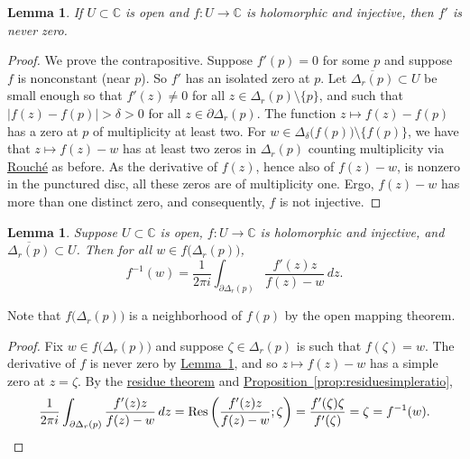 \documentclass[12pt,openany]{book}
\newcommand{\sabs}[1]{\lvert {#1} \rvert}
\newcommand{\C}{{\mathbb{C}}}
\theoremstyle{plain}
\newtheorem{lemma}[thm]{Lemma}
\theoremstyle{remark}
\theoremstyle{definition}
\theoremstyle{exercise}
\theoremstyle{example}
\newcommand{\propref}[1]{\hyperref[#1]{Proposition~\ref*{#1}}}
\newcommand{\lemmaref}[1]{\hyperref[#1]{Lemma~\ref*{#1}}}
\begin{document}
\begin{lemma} \label{lemma:dernonzero}
If $U \subset \C$ is open and $f \colon U \to \C$ is holomorphic and injective, then
$f'$ is never zero.
\end{lemma}

\begin{proof}
We prove the contrapositive.
Suppose $f'(p) = 0$ for some $p$
and suppose $f$ is nonconstant (near $p$).
So $f'$ has
an isolated zero at $p$.
Let $\overline{\Delta_r(p)} \subset U$
be small enough so that $f'(z) \not= 0$ for all $z \in \Delta_r(p) \setminus \{ p \}$,
and such that $\sabs{f(z)-f(p)} > \delta > 0$ for all $z \in \partial
\Delta_r(p)$.
The function $z \mapsto f(z) - f(p)$ has a zero at $p$ of multiplicity at least
two.
For $w \in \Delta_{\delta}\bigl(f(p)\bigr) \setminus \bigl\{ f(p) \bigr\}$,
we have that
$z \mapsto f(z)-w$ has at least two zeros in $\Delta_r(p)$ counting multiplicity via
\hyperref[thm:rouche2]{Rouch\'e} as
before.  As the derivative of $f(z)$, hence also of $f(z)-w$, is nonzero in
the punctured disc, all these zeros are of multiplicity one.  Ergo, $f(z)-w$
has more than one distinct zero, and consequently, $f$ is not injective.
\end{proof}

\begin{lemma} \label{lemma:inverseasintegral}
Suppose $U \subset \C$ is open,
$f \colon U \to \C$ is holomorphic and injective, and
$\overline{\Delta_r(p)} \subset U$.  Then for all $w \in
f\bigl(\Delta_r(p)\bigr)$,
\begin{equation*}
f^{-1}(w) = \frac{1}{2\pi i} \int_{\partial \Delta_r(p)}
\frac{f'(z)z}{f(z)-w} \, dz .
\end{equation*}
\end{lemma}

Note that $f\bigl(\Delta_r(p)\bigr)$ is a neighborhood of $f(p)$
by the open mapping theorem.

\begin{proof}
Fix $w \in f\bigl(\Delta_r(p)\bigr)$ and suppose $\zeta \in \Delta_r(p)$
is such that $f(\zeta) = w$.
The derivative of $f$ is never zero by \lemmaref{lemma:dernonzero},
and so $z \mapsto f(z)-w$ has a simple
zero at $z=\zeta$.  By the \hyperref[thm:residue]{residue theorem} and
\propref{prop:residuesimpleratio},
\begin{equation*}
\frac{1}{2\pi i} \int_{\partial \Delta_r(p)}
\frac{f'(z)z}{f(z)-w} \, dz
=
\operatorname{Res}\left(\frac{f'(z)z}{f(z)-w};\zeta\right)
=
\frac{f'(\zeta)\zeta}{f'(\zeta)} = \zeta = f^{-1}(w) .
\qedhere
\end{equation*}
\end{proof}
\end{document}
